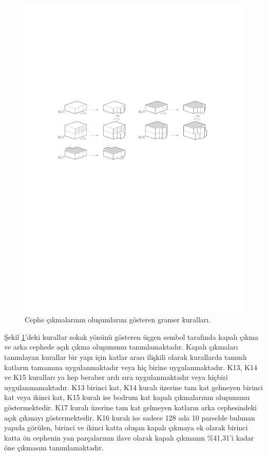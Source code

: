 \documentclass[12pt,turkish,a4paperpaper,]{report}
\begin{document}
\begin{figure}
\centering
\includegraphics[width=1\textwidth,height=\textheight]{source/figures/K13-K17.pdf}
\caption{Cephe çıkmalarının oluşumlarını gösteren gramer kuralları.
\label{K13K17}}
\end{figure}

Şekil \ref{K13K17}'deki kurallar sokak yönünü gösteren üçgen sembol
tarafında kapalı çıkma ve arka cephede açık çıkma oluşumunu
tanımlamaktadır. Kapalı çıkmaları tanımlayan kurallar bir yapı için
katlar arası ilişkili olarak kurallarda tanımlı katların tamamına
uygulanmaktadır veya hiç birine uygulanmaktadır. K13, K14 ve K15
kuralları ya hep beraber ardı sıra uygulanmaktadır veya hiçbiri
uygulanmamaktadır. K13 birinci kat, K14 kuralı üzerine tam kat gelmeyen
birinci kat veya ikinci kat, K15 kuralı ise bodrum kat kapalı
çıkmalarının oluşumunu göstermektedir. K17 kuralı üzerine tam kat
gelmeyen katların arka cephesindeki açık çıkmayı göstermektedir. K16
kuralı ise sadece 128 ada 10 parselde bulunan yapıda görülen, birinci ve
ikinci katta oluşan kapalı çıkmaya ek olarak birinci katta ön cephenin
yan parçalarının ilave olarak kapalı çıkmanın \%41,31'i kadar öne
çıkmasını tanımlamaktadır.
\end{document}
